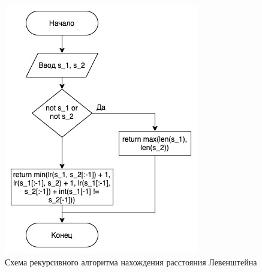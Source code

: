 \documentclass[12pt, a4paper]{report}
\begin{document}
\begin{figure}[h]
\centering
\includegraphics[width=0.8\linewidth]{lr.jpg}
\caption{Схема рекурсивного алгоритма нахождения расстояния Левенштейна}
\label{fig:mpr}
\end{figure}
\end{document}
